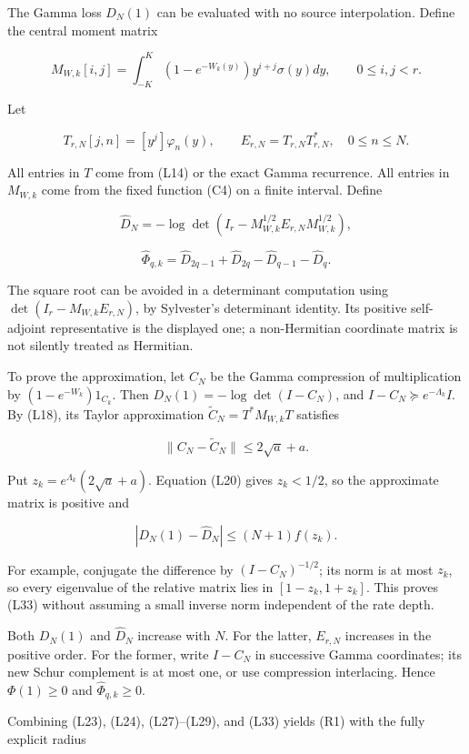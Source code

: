 The Gamma loss \(D_N(1)\) can be evaluated with no source interpolation. Define the central moment matrix

\[
M_{W,k}[i,j]=\int_{-K}^{K}
(1-e^{-W_k(y)})y^{i+j}\sigma(y)dy,
\qquad0\le i,j<r.
\tag{L30}
\]

Let

\[
T_{r,N}[j,n]=[y^j]\varphi_n(y),\qquad
E_{r,N}=T_{r,N}T_{r,N}^*,\quad 0\le n\le N.
\tag{L31}
\]

All entries in \(T\) come from (L14) or the exact Gamma recurrence. All entries in \(M_{W,k}\) come from the fixed function (C4) on a finite interval. Define

\[
\widehat D_N=-\log\det(I_r-M_{W,k}^{1/2}E_{r,N}M_{W,k}^{1/2}),
\]

\[
\boxed{\widehat\Phi_{q,k}
=\widehat D_{2q-1}+\widehat D_{2q}-\widehat D_{q-1}-\widehat D_q.}
\tag{L32}
\]

The square root can be avoided in a determinant computation using
\(\det(I_r-M_{W,k}E_{r,N})\), by Sylvester's determinant identity. Its positive self-adjoint representative is the displayed one; a non-Hermitian coordinate matrix is not silently treated as Hermitian.

To prove the approximation, let \(C_N\) be the Gamma compression of multiplication by \((1-e^{-W_k})1_{C_k}\). Then
\(D_N(1)=-\log\det(I-C_N)\), and \(I-C_N\succeq e^{-\Lambda_k}I\).
By (L18), its Taylor approximation \(\widetilde C_N=T^*M_{W,k}T\) satisfies

\[
\|C_N-\widetilde C_N\|\le2\sqrt a+a.
\]

Put \(z_k=e^{\Lambda_k}(2\sqrt a+a)\). Equation (L20) gives \(z_k<1/2\), so the approximate matrix is positive and

\[
|D_N(1)-\widehat D_N|\le(N+1)f(z_k).
\tag{L33}
\]

For example, conjugate the difference by \((I-C_N)^{-1/2}\); its norm is at most \(z_k\), so every eigenvalue of the relative matrix lies in \([1-z_k,1+z_k]\). This proves (L33) without assuming a small inverse norm independent of the rate depth.

Both \(D_N(1)\) and \(\widehat D_N\) increase with \(N\). For the latter, \(E_{r,N}\) increases in the positive order. For the former, write \(I-C_N\) in successive Gamma coordinates; its new Schur complement is at most one, or use compression interlacing. Hence \(\Phi(1)\ge0\) and \(\widehat\Phi_{q,k}\ge0\).

Combining (L23), (L24), (L27)--(L29), and (L33) yields (R1) with the fully explicit radius

